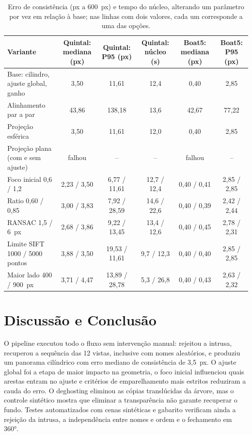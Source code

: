 \documentclass[10pt,a4paper]{article}
\begin{document}
\begin{table}[!htb]
\centering\footnotesize
\begin{tabularx}{\linewidth}{|>{\raggedright\arraybackslash}p{5.2cm}|C|C|C|C|C|}
\hline
{}\textbf{Variante} & \textbf{Quintal: mediana (px)} & \textbf{Quintal: P95 (px)} &
\textbf{Quintal: núcleo (s)} & \textbf{Boat5: mediana (px)} & \textbf{Boat5: P95 (px)} \\ \hline
Base: cilindro, ajuste global, ganho    & 3,50 & 11,61 & 12,4 & 0,40 & 2,85 \\ \hline
Alinhamento par a par                   & 43,86 & 138,18 & 13,6 & 42,67 & 77,22 \\ \hline
Projeção esférica                       & 3,50 & 11,61 & 12,0 & 0,40 & 2,85 \\ \hline
Projeção plana (com e sem ajuste)       & falhou & -- & -- & falhou & -- \\ \hline
Foco inicial 0,6 / 1,2                  & 2,23 / 3,50 & 6,77 / 11,61 & 12,7 / 12,4 & 0,40 / 0,41 & 2,85 / 2,85 \\ \hline
Ratio 0,60 / 0,85                       & 3,00 / 3,83 & 7,92 / 28,59 & 14,6 / 22,6 & 0,40 / 0,39 & 2,42 / 2,44 \\ \hline
RANSAC 1,5 / 6~px                       & 2,68 / 3,86 & 9,22 / 13,45 & 13,4 / 12,6 & 0,40 / 0,45 & 2,78 / 2,31 \\ \hline
Limite SIFT 1000 / 5000 pontos          & 3,88 / 3,50 & 19,53 / 11,61 & 9,7 / 12,3 & 0,40 / 0,40 & 2,85 / 2,85 \\ \hline
Maior lado 400 / 900~px                 & 3,71 / 4,47 & 13,89 / 28,78 & 5,3 / 26,8 & 0,40 / 0,43 & 2,63 / 2,32 \\ \hline
\end{tabularx}
\caption{Erro de consistência (px a 600~px) e tempo do núcleo, alterando um parâmetro por vez em relação
à base; nas linhas com dois valores, cada um corresponde a uma das opções.}
\label{tab:variantes}
\end{table}

\section{Discussão e Conclusão}
O pipeline executou todo o fluxo sem intervenção manual: rejeitou a intrusa, recuperou a sequência das 12
vistas, inclusive com nomes aleatórios, e produziu um panorama cilíndrico com erro mediano de consistência
de 3,5~px. O ajuste global foi a etapa de maior impacto na geometria, o foco inicial influenciou quais
arestas entram no ajuste e critérios de emparelhamento mais estritos reduziram a cauda do erro. O
deghosting eliminou as cópias translúcidas da árvore, mas o controle sintético mostra que eliminar a
transparência não garante recuperar o fundo. Testes automatizados com cenas sintéticas e gabarito
verificam ainda a rejeição da intrusa, a independência entre nomes e ordem e o fechamento em 360°.
\end{document}
